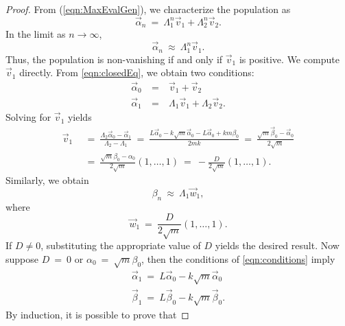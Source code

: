 \documentclass[11pt,reqno]{amsart}
\numberwithin{equation}{section}
\theoremstyle{plain}
\begin{document}
\begin{proof}
    From (\ref{eqn:MaxEvalGen}), we characterize the population as
    \begin{equation}\label{eqn:closedEq}
    \vec \alpha_n \ =\ \Lambda_1^{n}  \vec v_1+ \Lambda_2^{n}\vec v_2.
    \end{equation}
    In the limit as $n \rightarrow \infty$, 
    \begin{equation}
    \vec \alpha_n \ \approx\ \Lambda_1^{n}  \vec v_1.
    \end{equation}
    Thus, the population is non-vanishing if and only if $\vec v_1$ is positive. We compute $\vec v_1$ directly. From \ref{eqn:closedEq}, we obtain two conditions: 
    \begin{eqnarray}
        \vec \alpha_0 & \ = \ & \vec v_1 + \vec v_2 \nonumber \\ 
        \vec \alpha_1 & \ = \  & \Lambda_1 \vec v_1 + \Lambda_2 \vec v_2.
    \end{eqnarray}
    Solving for $\vec v_1$ yields 
    \begin{equation}
        \begin{split}
        \vec v_1 \ &\ = \ \frac {\Lambda_2 \vec\alpha_0 - \vec\alpha_1} {\Lambda_2 - \Lambda_1}
        \ = \ 
        \frac {L\vec \alpha_0 - k\sqrt m \vec \alpha_0 - L \vec \alpha_0 + km\beta_0} {2mk} 
        \ = \ 
        \frac {\sqrt{m}\vec\beta_0 -  \vec \alpha_0} {2\sqrt m} \\ 
        & \ = \ \frac {\sqrt m \beta_0 - \alpha_0} {2 \sqrt m} (1, \dots, 1) 
        \ = \ -\frac D{2\sqrt m} (1, \dots, 1).
        \end{split}
    \end{equation}
    Similarly, we obtain 
    \begin{equation}
        \beta_n \ \approx \ \Lambda_1 \vec w_1, 
    \end{equation}
    where 
    \begin{equation}
       \vec w_1 \ = \ \frac D {2\sqrt m }(1, \dots, 1).
    \end{equation}
    If $D \neq 0$, substituting the appropriate value of $D$ yields the desired result. Now suppose $D \ = \  0$ or $\alpha_0 \ = \ \sqrt m \beta _0$, then the conditions of \ref{eqn:conditions} imply
    \begin{eqnarray}
        \vec \alpha_1  \ = \ L \vec \alpha_0 - k \sqrt m \vec \alpha_0 \nonumber \\ 
        \vec \beta_1 \ = \ L \vec \beta_0 - k \sqrt m \vec \beta_0.
    \end{eqnarray} 
    By induction, it is possible to prove that 

\end{proof}
\end{document}
